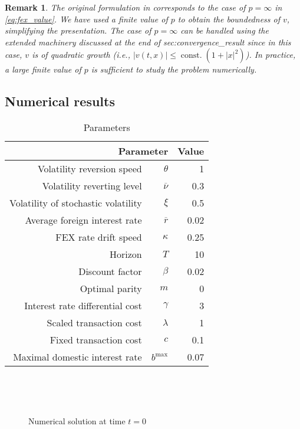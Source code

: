 \documentclass[12pt]{article}
\newcounter{dummy}
\newtheorem{rem}[dummy]{Remark}
\begin{document}
\begin{rem}The original formulation in \cite{MR1614233} corresponds
to the case of $p=\infty$ in \eqref{eq:fex_value}. We have used
a finite value of $p$ to obtain the boundedness of $v$, simplifying
the presentation. The case of $p=\infty$ can be handled using the
extended machinery discussed at the end of {\prettyref}{sec:convergence_result}
since in this case, $v$ is of quadratic growth (i.e., $|v(t,x)|{\leqslant}{\operatorname{const.}}(1+|x|^{2})$).
In practice, a large finite value of $p$ is sufficient to study the
problem numerically.\end{rem}

\subsection{\label{subsec:results}Numerical results}

\begin{table}
\centering
\footnotesize
\begin{tabular}{rrr}
\toprule 
\multicolumn{2}{r}{Parameter} & \multicolumn{1}{l}{Value}\tabularnewline
\midrule
Volatility reversion speed & $\theta$ & 1\tabularnewline
Volatility reverting level & $\overline{\nu}$ & 0.3\tabularnewline
Volatility of stochastic volatility & $\xi$ & 0.5\tabularnewline
Average foreign interest rate & $\overline{r}$ & 0.02\tabularnewline
FEX rate drift speed & $\kappa$ & 0.25\tabularnewline
Horizon & $T$ & 10\tabularnewline
Discount factor & $\beta$ & 0.02\tabularnewline
Optimal parity & $m$ & 0\tabularnewline
Interest rate differential cost & $\gamma$ & 3\tabularnewline
Scaled transaction cost & $\lambda$ & 1\tabularnewline
Fixed transaction cost & $c$ & 0.1\tabularnewline
Maximal domestic interest rate & $b^{\max}$ & 0.07\tabularnewline
\bottomrule
\end{tabular}
\caption{Parameters\label{tab:parameters}}
\end{table}

\begin{figure}
\centering
{}
~
\caption{}
\end{figure}

\begin{figure}
\centering
{}
~
\caption{Numerical solution at time $t=0$}
\end{figure}
\end{document}
